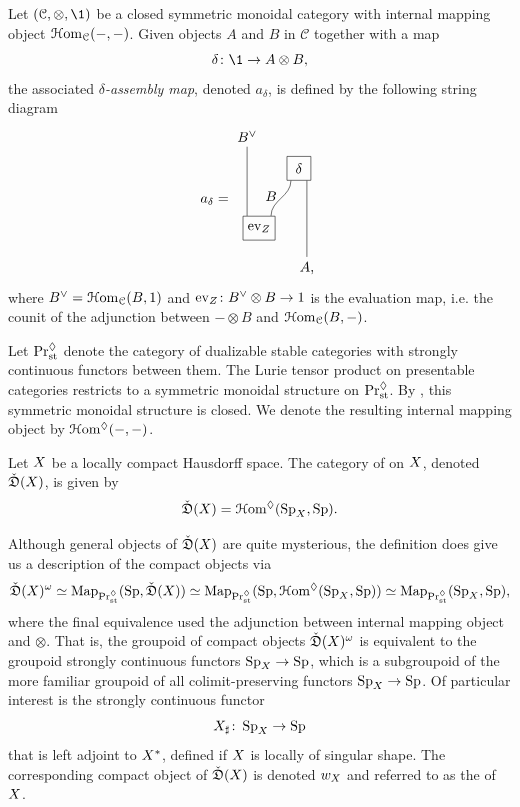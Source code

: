 \begin{defn}\label{defn: abstract assembly}
  Let $(\mathcal C,\otimes ,\1)$ be a closed symmetric monoidal category with internal mapping object $\operatorname{\mathcal{H}om}_{\mathcal C}({-},{-})$. Given objects $A$ and $B$ in $\mathcal C$ together with a map 
  \[
    \delta\colon \1\to A\otimes B,
  \]
  the associated {\em $\delta$-assembly map}, denoted $a_\delta$, is defined by the following string diagram 
  \begin{equation*}
    \label{eq:abstract-assembly}
    a_\delta =
    \begin{tikzpicture}[baseline=(current bounding box.center)]
      \node (Bvee) at (-0.3,3.3) {$B^\vee$};
      \node (deltabox) at (1,2.5) [rectangle, draw, minimum width=0.6cm, minimum height=0.6cm] {$\delta$};
      \node (evbox) at (0,1) [rectangle, draw, minimum width=0.6cm, minimum height=0.6cm] {$\mathrm{ev}_\base$};
      \node (A) at (1.2,0) {$A$,};
      \node (B) at (0.3,1.8) {$B$};

      \draw (Bvee) -- (evbox.north -| -0.3,1.3);
      \draw (deltabox.south -| 0.8,2.5) to [out=270,in=90] (evbox.north -| 0.3,1.3);
      \draw (deltabox.south -| 1.2,2.5) -- (A);
    \end{tikzpicture}
  \end{equation*}
  where $B^\vee = \operatorname{\mathcal{H}om}_{\mathcal C}(B,1)$ and $\mathrm{ev}_Z\colon B^\vee\otimes B\to 1$ is the evaluation map, i.e. the counit of the adjunction between ${-}\otimes B$ and $\operatorname{\mathcal{H}om}_{\mathcal C}(B,{-})$.
\end{defn}
Let $\mathrm{Pr}_{\mathrm{st}}^{\lozenge}$ denote the category of dualizable stable categories with strongly continuous functors between them. The Lurie tensor product on presentable categories restricts to a symmetric monoidal structure on $\mathrm{Pr}_{\mathrm{st}}^{\lozenge}$. By \cite{Ramzi2024}, this symmetric monoidal structure is closed. We denote the resulting internal mapping object by $\operatorname{\mathcal{H}om^{\lozenge}} ({-},{-})$.
\begin{defn}
  Let $X$ be a locally compact Hausdorff space. The category of  on $X$, denoted $\check{\mathfrak{D}} (X )$, is given by
  \[
    \check{\mathfrak{D}} (X ) = \operatorname{\mathcal{H}om^{\lozenge}} (\operatorname{Sp}_{X},\operatorname{Sp} ).
  \]
\end{defn}
Although general objects of $\check{\mathfrak{D}} (X )$ are quite mysterious, the definition does give us a description of the compact objects via
\[
  \check{\mathfrak{D}} (X )^\omega\simeq\operatorname{Map}_{\mathrm{Pr}_{\mathrm{st}}^{\lozenge}}(\operatorname{Sp} ,\check{\mathfrak{D}} (X ))
  \simeq\operatorname{Map}_{\mathrm{Pr}_{\mathrm{st}}^{\lozenge}}(\operatorname{Sp},\operatorname{\mathcal{H}om^{\lozenge}} (\operatorname{Sp}_{X},\operatorname{Sp} ))\simeq\operatorname{Map}_{\mathrm{Pr}_{\mathrm{st}}^{\lozenge}}(\operatorname{Sp}_{X},\operatorname{Sp}),
\]
where the final equivalence used the adjunction between internal mapping object and $\otimes$. That is, the groupoid of compact objects $\check{\mathfrak{D}} (X )^\omega$ is equivalent to the groupoid strongly continuous functors $\operatorname{Sp}_{X}\to\operatorname{Sp}$, which is a subgroupoid of the more familiar groupoid of all colimit-preserving functors $\operatorname{Sp}_{X}\to\operatorname{Sp}$. Of particular interest is the strongly continuous functor
\[
X_\sharp\colon\operatorname{Sp}_{X}\to\operatorname{Sp}
\]
that is left adjoint to $X^*$, defined if $X$ is locally of singular shape. The corresponding compact object of $\check{\mathfrak{D}} (X )$ is denoted $w_X$ and referred to as the  of $X$.

